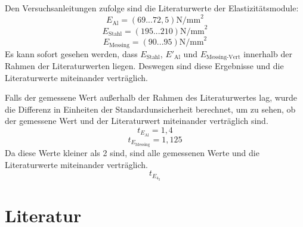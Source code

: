 \documentclass[11pt,a4paper]{article}
\begin{document}
Den Versuchsanleitungen zufolge sind die Literaturwerte der Elastizitätsmodule:
$$E_\textrm{Al} = (69 ... 72,5) \textrm{N/mm}^2$$
$$E_\textrm{Stahl} = (195 ... 210) \textrm{N/mm}^2$$
$$E_\textrm{Messing} = (90 ... 95) \textrm{N/mm}^2$$
Es kann sofort gesehen werden, dass $E_\textrm{Stahl}$, $E'_\textrm{Al}$ und $E_\textrm{Messing-Vert}$ innerhalb der Rahmen der Literaturwerten liegen. Deswegen sind diese Ergebnisse und die Literaturwerte miteinander verträglich. 

Falls der gemessene Wert außerhalb der Rahmen des Literaturwertes lag, wurde die Differenz in Einheiten der Standardunsicherheit berechnet, um zu sehen, ob der gemessene Wert und der Literaturwert miteinander verträglich sind. 
$$t_{E_\textrm{Al}} = 1,4$$
$$t_{E_\textrm{Messing}} = 1,125$$
Da diese Werte kleiner als 2 sind, sind alle gemessenen Werte und die Literaturwerte miteinander verträglich. 
$$t_{E_{4_{2}}}$$

\section{Literatur}
	
	
	
	
	
	
	
	
\end{document}
